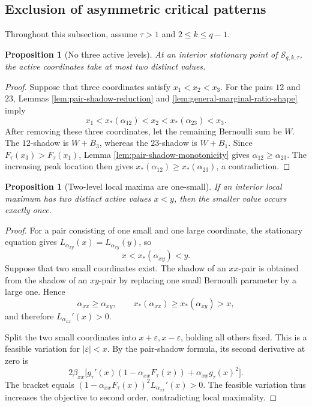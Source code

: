 \documentclass[11pt]{article}
\newtheorem{proposition}[theorem]{Proposition}
\theoremstyle{definition}
\theoremstyle{remark}
\newcommand{\1}{\mathbf 1}
\begin{document}
\subsection{Exclusion of asymmetric critical patterns}

Throughout this subsection, assume \(\tau>1\) and \(2\le k\le q-1\).

\begin{proposition}[No three active levels]
\label{prop:no-three-active-levels}
At an interior stationary point of \(\mathcal S_{q,k,\tau}\), the active coordinates take at most two distinct values.
\end{proposition}

\begin{proof}
Suppose that three coordinates satisfy \(x_1<x_2<x_3\).  For the pairs \(12\) and \(23\), Lemmas \ref{lem:pair-shadow-reduction} and \ref{lem:general-marginal-ratio-shape} imply
\[
  x_1<x_*(\alpha_{12})<x_2
  <x_*(\alpha_{23})<x_3.
\]
After removing these three coordinates, let the remaining Bernoulli sum be \(W\).  The \(12\)-shadow is \(W+B_3\), whereas the \(23\)-shadow is \(W+B_1\).  Since \(F_\tau(x_3)>F_\tau(x_1)\), Lemma \ref{lem:pair-shadow-monotonicity} gives
\(\alpha_{12}\ge\alpha_{23}\).  The increasing peak location then gives
\(x_*(\alpha_{12})\ge x_*(\alpha_{23})\), a contradiction.
\end{proof}

\begin{proposition}[Two-level local maxima are one-small]
\label{prop:two-level-one-small}
If an interior local maximum has two distinct active values \(x<y\), then the smaller value occurs exactly once.
\end{proposition}

\begin{proof}
For a pair consisting of one small and one large coordinate, the stationary equation gives
\(L_{\alpha_{xy}}(x)=L_{\alpha_{xy}}(y)\), so
\[
  x<x_*(\alpha_{xy})<y.
\]
Suppose that two small coordinates exist.  The shadow of an \(xx\)-pair is obtained from the shadow of an \(xy\)-pair by replacing one small Bernoulli parameter by a large one.  Hence
\[
  \alpha_{xx}\ge\alpha_{xy},
  \qquad x_*(\alpha_{xx})\ge x_*(\alpha_{xy})>x,
\]
and therefore \(L_{\alpha_{xx}}'(x)>0\).

Split the two small coordinates into \(x+\varepsilon,x-\varepsilon\), holding all others fixed.  This is a feasible variation for \(|\varepsilon|<x\).  By the pair-shadow formula, its second derivative at zero is
\[
  2\beta_{xx}\bigl[
       g_\tau'(x)(1-\alpha_{xx}F_\tau(x))
       +\alpha_{xx}g_\tau(x)^2\bigr].
\]
The bracket equals
\((1-\alpha_{xx}F_\tau(x))^2L_{\alpha_{xx}}'(x)>0\).
The feasible variation thus increases the objective to second order, contradicting local maximality.
\end{proof}
\end{document}
